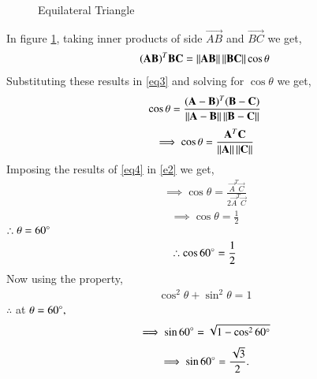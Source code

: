 \documentclass[journal,12pt,twocolumn]{IEEEtran}
\begin{document}
\renewcommand{\thefigure}{1}
\begin{figure}[!ht]
\centering
\resizebox{\columnwidth}{!}{}
\caption{Equilateral Triangle}
\label{fig1}
\end{figure}
In figure \ref{fig1}, taking inner products of side $\vec{AB}$ and $\vec{BC}$ we get,
\begin{align}
(\mathbf{AB})^T\mathbf{BC} = \left\lVert\mathbf{AB}\right\rVert\left\lVert\mathbf{BC}\right\rVert\cos\theta
\label{eq3}
\end{align}
Substituting these results in \eqref{eq3} and solving for $\cos\theta$ we get,
\begin{align}
\cos\theta = \frac{(\mathbf{A}-\mathbf{B})^T(\mathbf{B}-\mathbf{C})}{\left\lVert\mathbf{A}-\mathbf{B}\right\rVert\left\lVert\mathbf{B}-\mathbf{C}\right\rVert}
\end{align}
\begin{align}
\implies \cos\theta = \frac{\mathbf{A}^T\mathbf{C}}{\left\lVert\mathbf{A}\right\rVert\left\lVert\mathbf{C}\right\rVert}
\label{e2}
\end{align}
Imposing the results of \eqref{eq4} in \eqref{e2} we get,
\begin{align}
\implies \cos\theta = \frac{\vec{A}^T\vec{C}}{2\vec{A}^T\vec{C}}
\end{align}
\begin{align}
\implies \cos\theta = \frac{1}{2}
\end{align}
$\therefore \theta = 60\degree$
\begin{align}
\therefore \cos60\degree = \frac{1}{2}
\end{align}
Now using the property,
\begin{align}
\cos^2\theta +\sin^2\theta = 1
\end{align} 
$\therefore$ at $\theta = 60\degree, $
\begin{align}
\implies \sin60\degree = \sqrt{1-\cos^260\degree}
\end{align}
\begin{align}
\implies\sin60\degree = \frac{\sqrt{3}}{2}.
\end{align}
\end{document}
